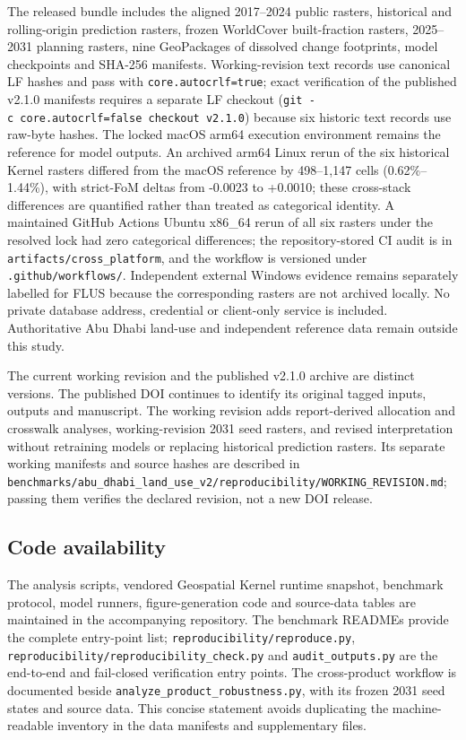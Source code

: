 \begin{itemize}
  The released bundle includes the aligned 2017--2024 public rasters,
  historical and rolling-origin prediction rasters, frozen WorldCover
  built-fraction rasters, 2025--2031 planning rasters, nine GeoPackages
  of dissolved change footprints, model checkpoints and SHA-256
  manifests. Working-revision text records use canonical LF hashes and
  pass with \texttt{core.autocrlf=true}; exact verification of the
  published v2.1.0 manifests requires a separate LF checkout
  (\texttt{git\ -c\ core.autocrlf=false\ checkout\ v2.1.0}) because six
  historic text records use raw-byte hashes. The locked macOS arm64
  execution environment remains the reference for model outputs. An
  archived arm64 Linux rerun of the six historical Kernel rasters
  differed from the macOS reference by 498--1,147 cells
  (0.62\%--1.44\%), with strict-FoM deltas from -0.0023 to +0.0010;
  these cross-stack differences are quantified rather than treated as
  categorical identity. A maintained GitHub Actions Ubuntu x86\_64 rerun
  of all six rasters under the resolved lock had zero categorical
  differences; the repository-stored CI audit is in
  \texttt{artifacts/cross\_platform}, and the workflow is versioned
  under \texttt{.github/workflows/}. Independent external Windows
  evidence remains separately labelled for FLUS because the
  corresponding rasters are not archived locally. No private database
  address, credential or client-only service is included. Authoritative
  Abu Dhabi land-use and independent reference data remain outside this
  study.
\end{itemize}

The current working revision and the published v2.1.0 archive are
distinct versions. The published DOI continues to identify its original
tagged inputs, outputs and manuscript. The working revision adds
report-derived allocation and crosswalk analyses, working-revision 2031
seed rasters, and revised interpretation without retraining models or
replacing historical prediction rasters. Its separate working manifests
and source hashes are described in
\texttt{benchmarks/abu\_dhabi\_land\_use\_v2/reproducibility/WORKING\_REVISION.md};
passing them verifies the declared revision, not a new DOI release.

\subsection{Code availability}\label{code-availability}

The analysis scripts, vendored Geospatial Kernel runtime snapshot,
benchmark protocol, model runners, figure-generation code and
source-data tables are maintained in the accompanying repository. The
benchmark READMEs provide the complete entry-point list;
\texttt{reproducibility/reproduce.py},
\texttt{reproducibility/reproducibility\_check.py} and
\texttt{audit\_outputs.py} are the end-to-end and fail-closed
verification entry points. The cross-product workflow is documented
beside \texttt{analyze\_product\_robustness.py}, with its frozen 2031
seed states and source data. This concise statement avoids duplicating
the machine-readable inventory in the data manifests and supplementary
files.

